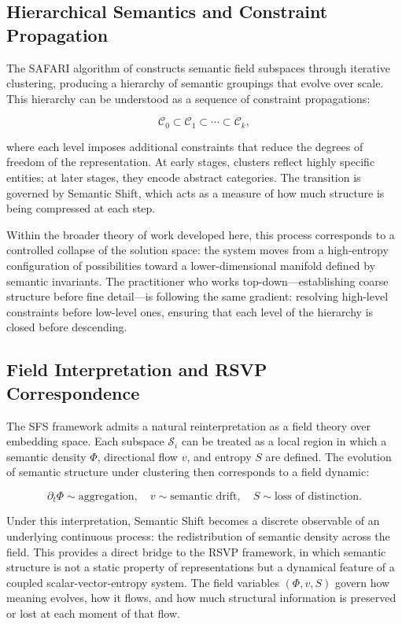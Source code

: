 \documentclass[11pt, twoside]{article}
\theoremstyle{plain}
\theoremstyle{definition}
\theoremstyle{remark}
\begin{document}
\subsection{Hierarchical Semantics and Constraint Propagation}

The SAFARI algorithm of \cite{sun2025swallow} constructs semantic field subspaces through iterative clustering, producing a hierarchy of semantic groupings that evolve over scale. This hierarchy can be understood as a sequence of constraint propagations:

\[
\mathcal{C}_0 \subset \mathcal{C}_1 \subset \cdots \subset \mathcal{C}_k,
\]

where each level imposes additional constraints that reduce the degrees of freedom of the representation. At early stages, clusters reflect highly specific entities; at later stages, they encode abstract categories. The transition is governed by Semantic Shift, which acts as a measure of how much structure is being compressed at each step.

Within the broader theory of work developed here, this process corresponds to a controlled collapse of the solution space: the system moves from a high-entropy configuration of possibilities toward a lower-dimensional manifold defined by semantic invariants. The practitioner who works top-down---establishing coarse structure before fine detail---is following the same gradient: resolving high-level constraints before low-level ones, ensuring that each level of the hierarchy is closed before descending.

\subsection{Field Interpretation and RSVP Correspondence}

The SFS framework admits a natural reinterpretation as a field theory over embedding space. Each subspace $\mathcal{S}_i$ can be treated as a local region in which a semantic density $\Phi$, directional flow $v$, and entropy $S$ are defined. The evolution of semantic structure under clustering then corresponds to a field dynamic:

\[
\partial_t \Phi \sim \text{aggregation}, \quad v \sim \text{semantic drift}, \quad S \sim \text{loss of distinction}.
\]

Under this interpretation, Semantic Shift becomes a discrete observable of an underlying continuous process: the redistribution of semantic density across the field. This provides a direct bridge to the RSVP framework, in which semantic structure is not a static property of representations but a dynamical feature of a coupled scalar-vector-entropy system. The field variables $(\Phi, v, S)$ govern how meaning evolves, how it flows, and how much structural information is preserved or lost at each moment of that flow.
\end{document}
